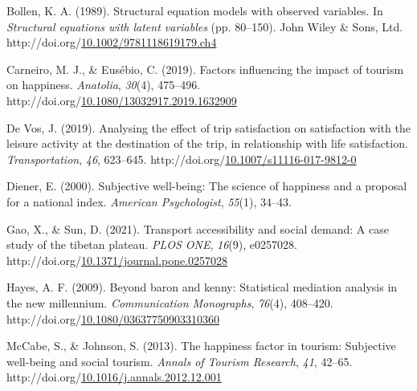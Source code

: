 \documentclass[
11pt, %
oneside, %
english, %
singlespacing, %
]{macthesis} %
\newlength{\cslhangindent}
\newenvironment{CSLReferences}[2] %
{\begin{list}{}{%
	\setlength{\itemindent}{0pt}
	\setlength{\leftmargin}{0pt}
	\setlength{\parsep}{0pt}
	\ifodd #1
	\setlength{\leftmargin}{\cslhangindent}
	\setlength{\itemindent}{-1\cslhangindent}
	\fi
	\setlength{\itemsep}{#2\baselineskip}}}
{\end{list}}
\begin{document}
\label{refs}
\begin{CSLReferences}{1}{0}
Bollen, K. A. (1989). Structural equation models with observed variables. In \emph{Structural equations with latent variables} (pp. 80--150). John Wiley \& Sons, Ltd. http://doi.org/\href{https://doi.org/10.1002/9781118619179.ch4}{10.1002/9781118619179.ch4}

Carneiro, M. J., \& Eusébio, C. (2019). Factors influencing the impact of tourism on happiness. \emph{Anatolia}, \emph{30}(4), 475--496. http://doi.org/\href{https://doi.org/10.1080/13032917.2019.1632909}{10.1080/13032917.2019.1632909}

De Vos, J. (2019). Analysing the effect of trip satisfaction on satisfaction with the leisure activity at the destination of the trip, in relationship with life satisfaction. \emph{Transportation}, \emph{46}, 623--645. http://doi.org/\href{https://doi.org/10.1007/s11116-017-9812-0}{10.1007/s11116-017-9812-0}

Diener, E. (2000). Subjective well-being: The science of happiness and a proposal for a national index. \emph{American Psychologist}, \emph{55}(1), 34--43.

Gao, X., \& Sun, D. (2021). Transport accessibility and social demand: A case study of the tibetan plateau. \emph{PLOS ONE}, \emph{16}(9), e0257028. http://doi.org/\href{https://doi.org/10.1371/journal.pone.0257028}{10.1371/journal.pone.0257028}

Hayes, A. F. (2009). Beyond baron and kenny: Statistical mediation analysis in the new millennium. \emph{Communication Monographs}, \emph{76}(4), 408--420. http://doi.org/\href{https://doi.org/10.1080/03637750903310360}{10.1080/03637750903310360}

McCabe, S., \& Johnson, S. (2013). The happiness factor in tourism: Subjective well-being and social tourism. \emph{Annals of Tourism Research}, \emph{41}, 42--65. http://doi.org/\href{https://doi.org/10.1016/j.annals.2012.12.001}{10.1016/j.annals.2012.12.001}

\end{CSLReferences}
\end{document}

